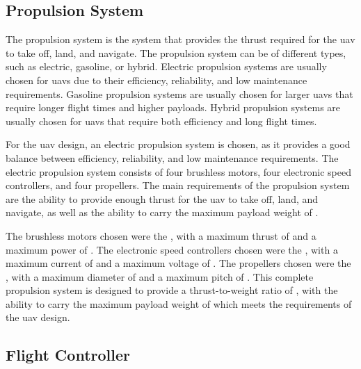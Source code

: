 
\subsection{Propulsion System}\label{subsec:design_propulsion_system}

The propulsion system is the system that provides the thrust required for the \gls{uav} to take off, land, and navigate. The propulsion system can be of different types, such as electric, gasoline, or hybrid. Electric propulsion systems are usually chosen for \glspl{uav} due to their efficiency, reliability, and low maintenance requirements. Gasoline propulsion systems are usually chosen for larger \glspl{uav} that require longer flight times and higher payloads. Hybrid propulsion systems are usually chosen for \glspl{uav} that require both efficiency and long flight times.

For the \gls{uav} design, an electric propulsion system is chosen, as it provides a good balance between efficiency, reliability, and low maintenance requirements. The electric propulsion system consists of four brushless motors, four electronic speed controllers, and four propellers. The main requirements of the propulsion system are the ability to provide enough thrust for the \gls{uav} to take off, land, and navigate, as well as the ability to carry the maximum payload weight of .

The brushless motors chosen were the , with a maximum thrust of  and a maximum power of . The electronic speed controllers chosen were the , with a maximum current of  and a maximum voltage of . The propellers chosen were the , with a maximum diameter of  and a maximum pitch of . This complete propulsion system is designed to provide a thrust-to-weight ratio of , with the ability to carry the maximum payload weight of  which meets the requirements of the \gls{uav} design.


\subsection{Flight Controller}

